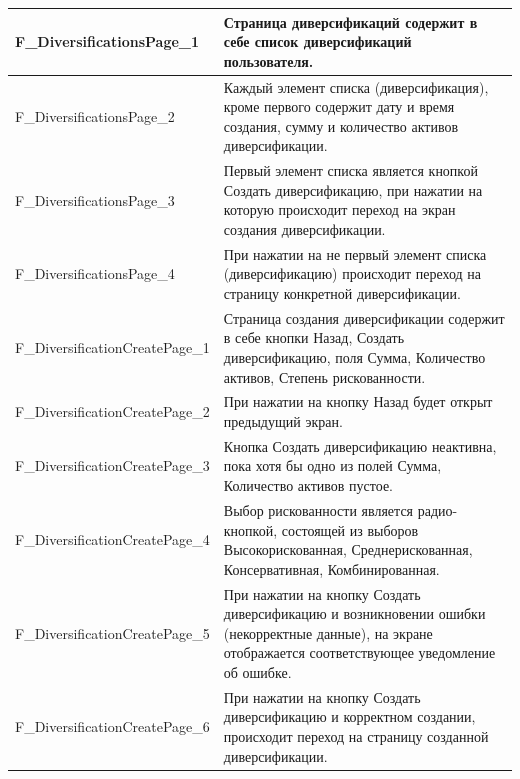 \documentclass[a4paper, 14pt]{article}
\begin{document}
\begin{longtable}{| p{} | p{} |}
    F\_DiversificationsPage\_1      & Страница диверсификаций содержит в себе список диверсификаций пользователя.                                                                                                        \\ \hline
    F\_DiversificationsPage\_2      & Каждый элемент списка (диверсификация), кроме первого содержит дату и время создания, сумму и количество активов диверсификации.                                                   \\ \hline
    F\_DiversificationsPage\_3      & Первый элемент списка является кнопкой Создать диверсификацию, при нажатии на которую происходит переход на экран создания диверсификации.                                         \\ \hline
    F\_DiversificationsPage\_4      & При нажатии на не первый элемент списка (диверсификацию) происходит переход на страницу конкретной диверсификации.                                                                 \\ \hline

    F\_DiversificationCreatePage\_1 & Страница создания диверсификации содержит в себе кнопки Назад, Создать диверсификацию, поля Сумма, Количество активов, Степень рискованности.                                      \\ \hline
    F\_DiversificationCreatePage\_2 & При нажатии на кнопку Назад будет открыт предыдущий экран.                                                                                                                         \\ \hline
    F\_DiversificationCreatePage\_3 & Кнопка Создать диверсификацию неактивна, пока хотя бы одно из полей Сумма, Количество активов пустое.                                                                              \\ \hline
    F\_DiversificationCreatePage\_4 & Выбор рискованности является радио-кнопкой, состоящей из выборов Высокорискованная, Среднерискованная, Консервативная, Комбинированная.                                            \\ \hline
    F\_DiversificationCreatePage\_5 & При нажатии на кнопку Создать диверсификацию и возникновении ошибки (некорректные данные), на экране отображается соответствующее уведомление об ошибке.                           \\ \hline
    F\_DiversificationCreatePage\_6 & При нажатии на кнопку Создать диверсификацию и корректном создании, происходит переход на страницу созданной диверсификации.                                                       \\ \hline


\end{longtable}
\end{document}

